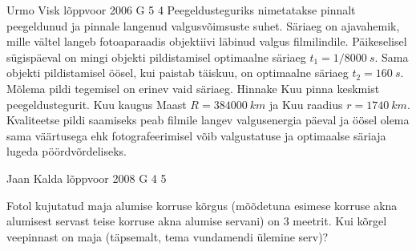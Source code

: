 \documentclass[11pt]{article}
\begin{document}
{%
{Urmo Visk} %
{lõppvoor} %
{2006} %
{G 5} %
{4} %
{
\ifStatement
Peegeldusteguriks nimetatakse pinnalt peegeldunud ja pinnale langenud valgusvõimsuste suhet. Säriaeg on ajavahemik, mille vältel langeb fotoaparaadis objektiivi läbinud valgus filmilindile. Päikeselisel sügispäeval on mingi objekti pildistamisel optimaalne säriaeg $t_1 = 1/\SI{8000}{s}$. Sama objekti pildistamisel öösel, kui paistab täiskuu, on optimaalne säriaeg $t_2 = \SI{160}{s}$. Mõlema pildi tegemisel on erinev vaid säriaeg. Hinnake Kuu pinna keskmist peegeldustegurit. Kuu kaugus Maast $R = \SI{384000}{km}$ ja Kuu raadius $r = \SI{1740}{km}$. Kvaliteetse pildi saamiseks peab filmile langev valgusenergia päeval ja öösel olema sama väärtusega ehk fotografeerimisel võib valgustatuse ja optimaalse säriaja lugeda pöördvõrdeliseks.
\fi
}

{Jaan Kalda} %
{lõppvoor} %
{2008} %
{G 4} %
{5} %
{
\ifStatement
Fotol kujutatud maja alumise korruse kõrgus (mõõdetuna esimese korruse akna alumisest servast teise korruse akna alumise servani) on 3 meetrit. Kui kõrgel veepinnast on maja (täpsemalt, tema vundamendi ülemine serv)?

}}
\end{document}
